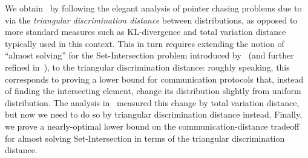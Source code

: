 We obtain~ by following the elegant analysis of pointer chasing problems due to~\cite{Yehudayoff20} via the \emph{triangular discrimination distance} between distributions, as opposed to more standard measures 
such as KL-divergence and total variation distance typically used in this context. This in turn requires extending the notion of ``almost solving'' for the Set-Intersection problem introduced by~\cite{AssadiCK19} (and further refined in~\cite{AssadiR20}),
to the triangular discrimination distance: roughly speaking, this corresponds to proving a lower bound for communication protocols that, instead of finding the intersecting element, change its distribution slightly 
from uniform distribution. The analysis in~\cite{AssadiCK19} measured this change by total variation distance, but now we need to do so by triangular discrimination distance instead. Finally, we prove a nearly-optimal
lower bound on the communication-distance tradeoff for almost solving Set-Intersection in terms of the triangular discrimination distance. 



